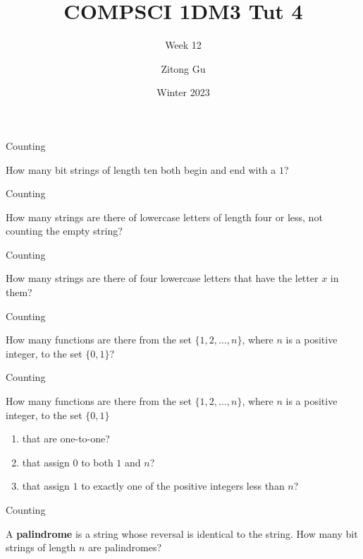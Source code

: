 \documentclass{beamer}
\title{COMPSCI 1DM3 Tut 4}
\subtitle{Week 12}
\author{Zitong Gu}
\institute{McMaster University}
\date{Winter 2023}
\begin{document}
\frame{\titlepage}

\begin{frame}[t]{Counting}
    \begin{example}
        How many bit strings of length ten both begin and end with a $1$?
    \end{example}
\end{frame}

\begin{frame}[t]{Counting}
    \begin{example}
        How many strings are there of lowercase letters of length four or less, not counting the empty string?
    \end{example}
\end{frame}

\begin{frame}[t]{Counting}
    \begin{example}
        How many strings are there of four lowercase letters that have the letter $x$ in them?
    \end{example}
\end{frame}

\begin{frame}[t]{Counting}
    \begin{example}
        How many functions are there from the set $\{1,2,\dots,n\}$, where $n$ is a positive integer, to the set $\{0,1\}$?
    \end{example}
\end{frame}

\begin{frame}[t]{Counting}
    \begin{example}
        How many functions are there from the set $\{1,2,\dots,n\}$, where $n$ is a positive integer, to the set $\{0,1\}$ \begin{enumerate}
            \item that are one-to-one?
            \item that assign $0$ to both $1$ and $n$?
            \item that assign $1$ to exactly one of the positive integers less than $n$?
        \end{enumerate}
    \end{example}
\end{frame}

\begin{frame}[t]{Counting}
    \begin{example}
        A \textbf{palindrome} is a string whose reversal is identical to the string. How many bit strings of length $n$ are palindromes?
    \end{example}
\end{frame}
\end{document}
